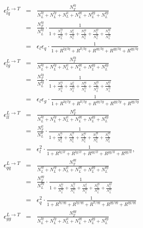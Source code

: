 \documentclass[12pt,oneandhalf,chaparabic,phys,ms,eng]{metu}
\begin{document}
\begin{eqnarray}
\epsilon_{lq}^{L \rightarrow T} & = & \frac{N_{T}^{lq}}{N_{L}^{lq}+N_{L}^{lg}+N_{L}^{ll}+N_{L}^{qq}+N_{L}^{gg}+N_{L}^{qg}} \nonumber \\ 
& = &
\frac{N_{T}^{lq}}{N_{L}^{lq}} \cdot \frac{1}{1 + \frac{N_{L}^{lg}}{N_{L}^{lq}} + \frac{N_{L}^{ll}}{N_{L}^{lq}} + \frac{N_{L}^{qq}}{N_{L}^{lq}} + \frac{N_{L}^{gg}}{N_{L}^{lq}} + \frac{N_{L}^{qg}}{N_{L}^{lq}}} \nonumber \\
& = & \epsilon_{l} \epsilon_{q} \cdot \frac{1}{1 + R^{lg/lq} + R^{ll/lq} + R^{qq/lq} + R^{gg/lq} + R^{qg/lq}} \label{eq:eps11_}\\
\epsilon_{lg}^{L \rightarrow T} & = & \frac{N_{T}^{lg}}{N_{L}^{lq}+N_{L}^{lg}+N_{L}^{ll}+N_{L}^{qq}+N_{L}^{gg}+N_{L}^{qg}} \nonumber \\
& = &
\frac{N_{T}^{lg}}{N_{L}^{lg}} \cdot \frac{1}{1 + \frac{N_{L}^{lq}}{N_{L}^{lg}} + \frac{N_{L}^{ll}}{N_{L}^{lg}} + \frac{N_{L}^{qq}}{N_{L}^{lg}} + \frac{N_{L}^{gg}}{N_{L}^{lg}} + \frac{N_{L}^{qg}}{N_{L}^{lg}}} \nonumber \\
& = & \epsilon_{l} \epsilon_{g} \cdot \frac{1}{1 + R^{lq/lg} + R^{ll/lg} + R^{qq/lg} + R^{gg/lg} + R^{qg/lg}} \label{eq:eps12_}\\
\epsilon_{ll}^{L \rightarrow T} & = & \frac{N_{T}^{ll}}{N_{L}^{lq}+N_{L}^{lg}+N_{L}^{ll}+N_{L}^{qq}+N_{L}^{gg}+N_{L}^{qg}} \nonumber \\
& = &
\frac{N_{T}^{ll}}{N_{L}^{ll}} \cdot \frac{1}{1 + \frac{N_{L}^{lq}}{N_{L}^{ll}} + \frac{N_{L}^{lg}}{N_{L}^{ll}} + \frac{N_{L}^{qq}}{N_{L}^{ll}} + \frac{N_{L}^{gg}}{N_{L}^{ll}} + \frac{N_{L}^{qg}}{N_{L}^{ll}}} \nonumber \\
& = & \epsilon_{l}^{2} \cdot \frac{1}{1 + R^{lq/ll} + R^{lg/ll} + R^{qq/ll} + R^{gg/ll} + R^{qg/ll}}, \label{eq:eps13_}\\
\epsilon_{qq}^{L \rightarrow T} & = & \frac{N_{T}^{qq}}{N_{L}^{lq}+N_{L}^{lg}+N_{L}^{ll}+N_{L}^{qq}+N_{L}^{gg}+N_{L}^{qg}} \nonumber \\
& = &  
\frac{N_{T}^{qq}}{N_{L}^{qq}} \cdot \frac{1}{1 + \frac{N_{L}^{lq}}{N_{L}^{qq}} + \frac{N_{L}^{lg}}{N_{L}^{qq}} + \frac{N_{L}^{ll}}{N_{L}^{qq}} + \frac{N_{L}^{gg}}{N_{L}^{qq}} + \frac{N_{L}^{qg}}{N_{L}^{qq}}} \nonumber \\
& = & \epsilon_{q}^{2} \cdot \frac{1}{1 + R^{lq/qq} + R^{lg/qq} + R^{ll/qq} + R^{gg/qq} + R^{qg/qq}} \label{eq:eps14_}\\
\epsilon_{gg}^{L \rightarrow T} & = & \frac{N_{T}^{gg}}{N_{L}^{lq}+N_{L}^{lg}+N_{L}^{ll}+N_{L}^{qq}+N_{L}^{gg}+N_{L}^{qg}} \nonumber \\

\end{eqnarray}
\end{document}
